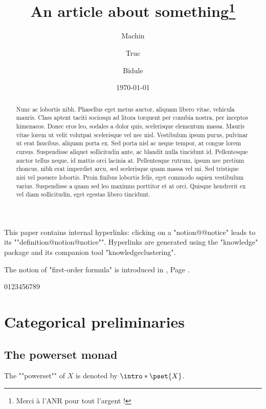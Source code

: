 \documentclass{fancy-article}
\title{An article about something\thanks{Merci à l'ANR pour tout l'argent !}}
\author[1]{Machin}
\author[2]{Truc}
\author[1]{Bidule}
\affil[1]{Institut du Fromage}
\affil[2]{Baguette Université Sorbonne-Est}
\date{\today}
\begin{document}
\maketitle

\begin{abstract}
  Nunc ac lobortis nibh. Phasellus eget metus auctor, aliquam libero vitae, vehicula mauris. Class aptent taciti sociosqu ad litora torquent per conubia nostra, per inceptos himenaeos. Donec eros leo, sodales a dolor quis, scelerisque elementum massa. Mauris vitae lorem ut velit volutpat scelerisque vel nec nisl. Vestibulum ipsum purus, pulvinar ut erat faucibus, aliquam porta ex. Sed porta nisl ac neque tempor, at congue lorem cursus. Suspendisse aliquet sollicitudin ante, ac blandit nulla tincidunt id. Pellentesque auctor tellus neque, id mattis orci lacinia at. Pellentesque rutrum, ipsum nec pretium rhoncus, nibh erat imperdiet arcu, sed scelerisque quam massa vel mi. Sed tristique nisi vel posuere lobortis. Proin finibus lobortis felis, eget commodo sapien vestibulum varius. Suspendisse a quam sed leo maximus porttitor et at orci. Quisque hendrerit ex vel diam sollicitudin, eget egestas libero tincidunt. 
\end{abstract}

 This paper contains internal hyperlinks: clicking on a "notion@@notice"
leads to its \AP""definition@notion@notice"".
Hyperlinks are generated using the   
"knowledge" package and its companion tool "knowledge\-clustering".

The notion of "first-order formula" is introduced in
, Page .

0123456789



\section{Categorical preliminaries}
 
\subsection{The powerset monad}

\AP The ""powerset"" of $X$ is denoted by $\intro*\pset{X}$.
\end{document}
